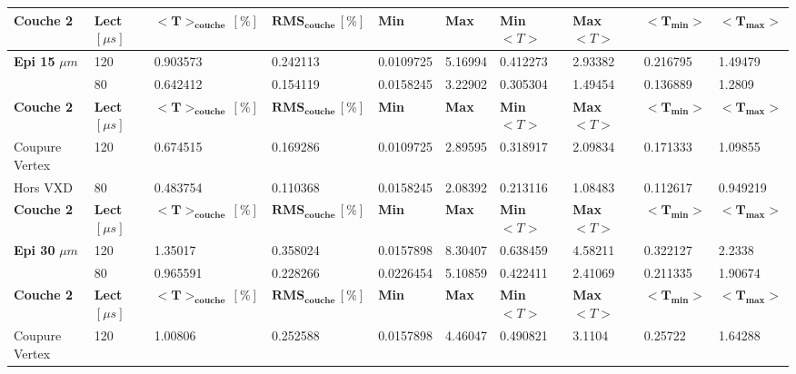 \begin{table}
\small
\centering
\begin{tabular}{|l|l|l|l|l|l|l|l|l|l|}
\hline
\textbf{Couche 2} & \textbf{Lect} $[\mu s]$ & $\mathbf{<T>_{couche} \, [\%]}$ & $\mathbf{RMS_{couche} \, [\%]}$ & \textbf{Min} & \textbf{Max} & \textbf{Min} $<T>$ & \textbf{Max} $<T>$ & $\mathbf{<T_{min}>}$ & $\mathbf{<T_{max}>}$ \\ \hline
     \textbf{Epi 15} $\mu m$                   & 120     & 0.903573           & 0.242113          & 0.0109725  & 5.16994 & 0.412273 & 2.93382  & 0.216795  & 1.49479   \\ \hline
                        & 80      & 0.642412           & 0.154119          & 0.0158245  & 3.22902 & 0.305304 & 1.49454  & 0.136889  & 1.2809    \\ \hline
\textbf{Couche 2} & \textbf{Lect} $[\mu s]$ & $\mathbf{<T>_{couche} \, [\%]}$ & $\mathbf{RMS_{couche} \, [\%]}$ & \textbf{Min} & \textbf{Max} & \textbf{Min} $<T>$ & \textbf{Max} $<T>$ & $\mathbf{<T_{min}>}$ & $\mathbf{<T_{max}>}$ \\ \hline
Coupure Vertex          & 120     & 0.674515           & 0.169286          & 0.0109725  & 2.89595 & 0.318917 & 2.09834  & 0.171333  & 1.09855   \\ \hline
Hors VXD                & 80      & 0.483754           & 0.110368          & 0.0158245  & 2.08392 & 0.213116 & 1.08483  & 0.112617  & 0.949219  \\ \hline
\textbf{Couche 2} & \textbf{Lect} $[\mu s]$ & $\mathbf{<T>_{couche} \, [\%]}$ & $\mathbf{RMS_{couche} \, [\%]}$ & \textbf{Min} & \textbf{Max} & \textbf{Min} $<T>$ & \textbf{Max} $<T>$ & $\mathbf{<T_{min}>}$ & $\mathbf{<T_{max}>}$ \\ \hline
    \textbf{Epi 30} $\mu m$                    & 120     & 1.35017            & 0.358024          & 0.0157898  & 8.30407 & 0.638459 & 4.58211  & 0.322127  & 2.2338    \\ \hline
                        & 80      & 0.965591           & 0.228266          & 0.0226454  & 5.10859 & 0.422411 & 2.41069  & 0.211335  & 1.90674   \\ \hline
\textbf{Couche 2} & \textbf{Lect} $[\mu s]$ & $\mathbf{<T>_{couche} \, [\%]}$ & $\mathbf{RMS_{couche} \, [\%]}$ & \textbf{Min} & \textbf{Max} & \textbf{Min} $<T>$ & \textbf{Max} $<T>$ & $\mathbf{<T_{min}>}$ & $\mathbf{<T_{max}>}$ \\ \hline
Coupure Vertex          & 120     & 1.00806            & 0.252588          & 0.0157898  & 4.46047 & 0.490821 & 3.1104   & 0.25722   & 1.64288   \\ \hline

\end{tabular}
\end{table}
